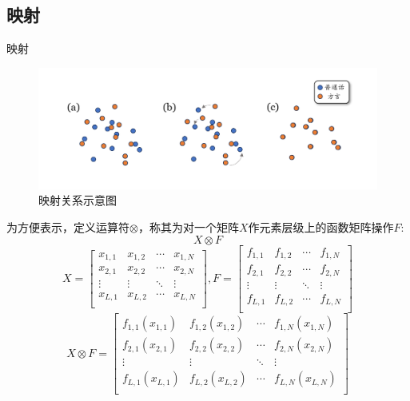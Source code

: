 \documentclass[10pt]{beamer}
\begin{document}
\subsection{映射}
\begin{frame}{映射}
    \begin{figure}[h]
        \caption{\label{fig:map_easy}映射关系示意图}
        \centering
        \includegraphics[scale=0.2]{Map.png}
    \end{figure}
\end{frame}
\begin{frame}
    为方便表示，定义运算符$\otimes$，称其为对一个矩阵$X$作元素层级上的函数矩阵操作$F$:
    \begin{equation}
        X \otimes F
    \end{equation}
    \begin{equation}
        X = \begin{bmatrix}
            x_{1,1} & x_{1,2} & \cdots & x_{1,N} \\
            x_{2,1} & x_{2,2} & \cdots & x_{2,N} \\
            \vdots & \vdots & \ddots & \vdots \\
            x_{L,1} & x_{L,2} & \cdots & x_{L,N}\\
        \end{bmatrix},F = \begin{bmatrix}
            f_{1,1} & f_{1,2} & \cdots & f_{1,N} \\
            f_{2,1} & f_{2,2} & \cdots & f_{2,N} \\
            \vdots & \vdots & \ddots & \vdots \\
            f_{L,1} & f_{L,2} & \cdots & f_{L,N}\\
        \end{bmatrix}
    \end{equation}
    \begin{equation}
        X \otimes F = \begin{bmatrix}
            f_{1,1}(x_{1,1}) & f_{1,2}(x_{1,2}) & \cdots & f_{1,N}(x_{1,N}) \\
            f_{2,1}(x_{2,1}) & f_{2,2}(x_{2,2}) & \cdots & f_{2,N}(x_{2,N}) \\
            \vdots & \vdots & \ddots & \vdots \\
            f_{L,1}(x_{L,1}) & f_{L,2}(x_{L,2}) & \cdots & f_{L,N}(x_{L,N})\\
        \end{bmatrix}
    \end{equation}
\end{frame}
\end{document}
